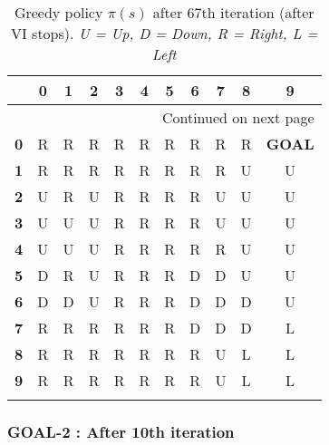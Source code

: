 \documentclass{article}
\begin{document}
\begin{longtable}{|c|c|c|c|c|c|c|c|c|c|c|}
\toprule
{} &  0 &  1 &  2 &  3 &  4 &  5 &  6 &  7 &  8 &  9 \\
\midrule
\endhead
\midrule
\multicolumn{11}{r}{{Continued on next page}} \\
\midrule
\endfoot

\bottomrule
\endlastfoot
\textbf{0} &  R &  R &  R &  R &  R &  R &  R &  R &  R & \textbf{GOAL}  \\\hline
\textbf{1} &  R &  R &  R &  R &  R &  R &  R &  R &  U &  U \\\hline
\textbf{2} &  U &  R &  U &  R &  R &  R &  R &  U &  U &  U \\\hline
\textbf{3} &  U &  U &  U &  R &  R &  R &  R &  U &  U &  U \\\hline
\textbf{4} &  U &  U &  U &  R &  R &  R &  R &  R &  U &  U \\\hline
\textbf{5} &  D &  R &  U &  R &  R &  R &  D &  D &  U &  U \\\hline
\textbf{6} &  D &  D &  U &  R &  R &  R &  D &  D &  D &  U \\\hline
\textbf{7} &  R &  R &  R &  R &  R &  R &  D &  D &  D &  L \\\hline
\textbf{8} &  R &  R &  R &  R &  R &  R &  R &  U &  L &  L \\\hline
\textbf{9} &  R &  R &  R &  R &  R &  R &  R &  U &  L &  L \\\hline
\caption{Greedy policy $\pi(s)$ after 67th iteration (after VI stops)\label{tab:greedypolicy-goal1}. \textit{U = Up, D = Down, R = Right, L = Left}}
\end{longtable}

\subsubsection*{GOAL-2 : After 10th iteration}
\end{document}
